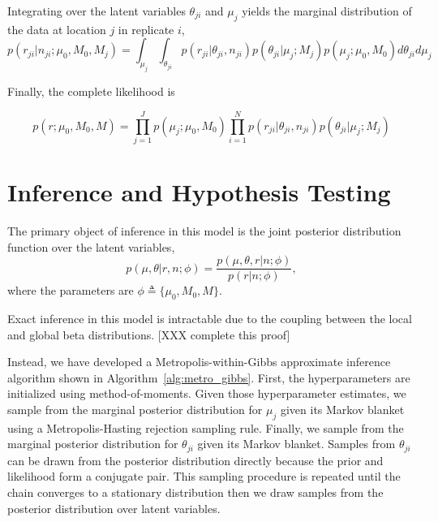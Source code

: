 \documentclass[11pt,reqno]{amsart}
\begin{document}
Integrating over the latent variables $\theta_{ji}$ and $\mu_j$ yields the marginal distribution of the data at location $j$ in replicate $i$, 
\begin{equation}
p \left( r_{ji} | n_{ji} ; \mu_0, M_0, M_j \right) = \int_{\mu_j} \int_{\theta_{ji}}  p \left( r_{ji} | \theta_{ji}, n_{ji} \right) p\left( \theta_{ji} | \mu_j; M_j \right) p\left( \mu_j; \mu_0, M_0 \right) d\theta_{ji} d\mu_j
\end{equation}

Finally, the complete likelihood is

\begin{equation}
p \left( r ; \mu_0, M_0, M \right) = \prod_{j=1}^J p\left( \mu_j; \mu_0, M_0 \right) \prod_{i=1}^N p \left( r_{ji} | \theta_{ji}, n_{ji} \right) p\left( \theta_{ji} | \mu_j; M_j \right) 
\end{equation}

\section{Inference and Hypothesis Testing}

The primary object of inference in this model is the joint posterior distribution function over the latent variables,
\begin{equation}
	p(\mu, \theta | r, n; \phi)  = \frac{ p(\mu, \theta, r | n; \phi) } {p ( r | n; \phi)},
\end{equation}
where the parameters are $\phi \triangleq \{\mu_0, M_0, M\}$.

Exact inference in this model is intractable due to the coupling between the local and global beta distributions. [XXX complete this proof] 

Instead, we have developed a Metropolis-within-Gibbs  approximate inference algorithm shown in Algorithm~\ref{alg:metro_gibbs}. First, the hyperparameters are initialized using method-of-moments. Given those hyperparameter estimates, we sample from the marginal posterior distribution for $\mu_j$ given its Markov blanket using a Metropolis-Hasting rejection sampling rule. Finally, we sample from the marginal posterior distribution for $\theta_{ji}$ given its Markov blanket. Samples from $\theta_{ji}$ can be drawn from the posterior distribution directly  because the prior and likelihood form a conjugate pair. This sampling procedure is repeated until the chain converges to a stationary distribution then we draw samples from the posterior distribution over latent variables.
\end{document}
